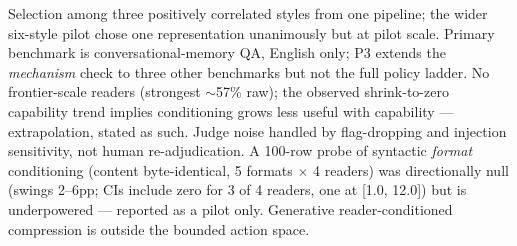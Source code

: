 Selection among three positively correlated styles from one pipeline; the wider
six-style pilot chose one representation unanimously but at pilot scale. Primary
benchmark is conversational-memory QA, English only; P3 extends the
\emph{mechanism} check to three other benchmarks but not the full policy ladder.
No frontier-scale readers (strongest $\sim$57\% raw); the observed
shrink-to-zero capability trend implies conditioning grows less useful with
capability --- extrapolation, stated as such. Judge noise handled by
flag-dropping and injection sensitivity, not human re-adjudication. A 100-row
probe of syntactic \emph{format} conditioning (content byte-identical, 5 formats
$\times$ 4 readers) was directionally null (swings 2--6pp; CIs include zero for 3
of 4 readers, one at [1.0, 12.0]) but is underpowered --- reported as a pilot
only. Generative reader-conditioned compression is outside the bounded action
space.
